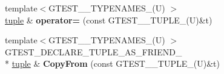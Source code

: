\begin{DoxyCompactItemize}
\item 
\hypertarget{classstd_1_1tr1_1_1tuple_af0df06ea0529f3caa6cbbf9daaa4d341}{{\footnotesize template$<$G\-T\-E\-S\-T\-\_\-\_\-\-T\-Y\-P\-E\-N\-A\-M\-E\-S\-\_\-(\-U) $>$ }\\\hyperlink{classstd_1_1tr1_1_1tuple}{tuple} \& {\bfseries operator=} (const G\-T\-E\-S\-T\-\_\-\_\-\-T\-U\-P\-L\-E\-\_\-(U)\&t)}\label{classstd_1_1tr1_1_1tuple_af0df06ea0529f3caa6cbbf9daaa4d341}

\item 
\hypertarget{classstd_1_1tr1_1_1tuple_aa76d0c02e6f4c6c99f32f9738623f23c}{{\footnotesize template$<$G\-T\-E\-S\-T\-\_\-\_\-\-T\-Y\-P\-E\-N\-A\-M\-E\-S\-\_\-(\-U) $>$ }\\G\-T\-E\-S\-T\-\_\-\-D\-E\-C\-L\-A\-R\-E\-\_\-\-T\-U\-P\-L\-E\-\_\-\-A\-S\-\_\-\-F\-R\-I\-E\-N\-D\-\_\- \\*
\hyperlink{classstd_1_1tr1_1_1tuple}{tuple} \& {\bfseries Copy\-From} (const G\-T\-E\-S\-T\-\_\-\_\-\-T\-U\-P\-L\-E\-\_\-(U)\&t)}\label{classstd_1_1tr1_1_1tuple_aa76d0c02e6f4c6c99f32f9738623f23c}

\end{DoxyCompactItemize}
